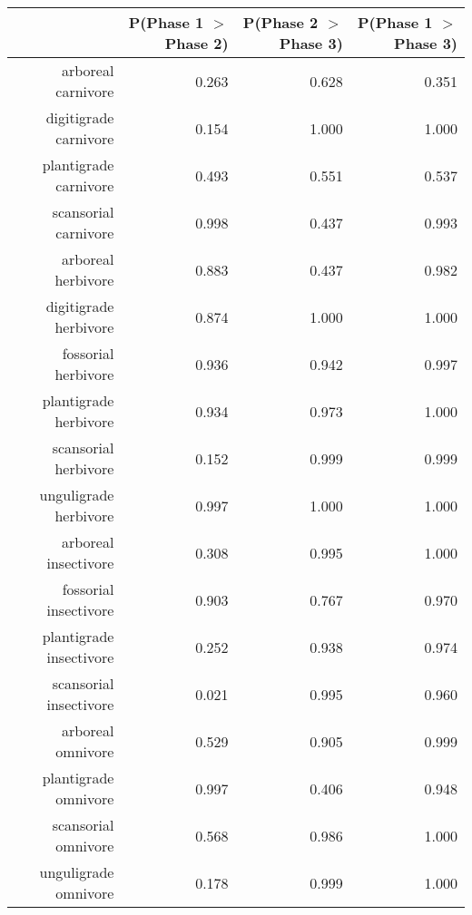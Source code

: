 \begin{table}[ht]
\centering
\begin{tabular}{rrrr}
  \hline
 & P(Phase 1 $>$ Phase 2) & P(Phase 2 $>$ Phase 3) & P(Phase 1 $>$ Phase 3) \\ 
  \hline
arboreal carnivore & 0.263 & 0.628 & 0.351 \\ 
  digitigrade carnivore & 0.154 & 1.000 & 1.000 \\ 
  plantigrade carnivore & 0.493 & 0.551 & 0.537 \\ 
  scansorial carnivore & 0.998 & 0.437 & 0.993 \\ 
  arboreal herbivore & 0.883 & 0.437 & 0.982 \\ 
  digitigrade herbivore & 0.874 & 1.000 & 1.000 \\ 
  fossorial herbivore & 0.936 & 0.942 & 0.997 \\ 
  plantigrade herbivore & 0.934 & 0.973 & 1.000 \\ 
  scansorial herbivore & 0.152 & 0.999 & 0.999 \\ 
  unguligrade herbivore & 0.997 & 1.000 & 1.000 \\ 
  arboreal insectivore & 0.308 & 0.995 & 1.000 \\ 
  fossorial insectivore & 0.903 & 0.767 & 0.970 \\ 
  plantigrade insectivore & 0.252 & 0.938 & 0.974 \\ 
  scansorial insectivore & 0.021 & 0.995 & 0.960 \\ 
  arboreal omnivore & 0.529 & 0.905 & 0.999 \\ 
  plantigrade omnivore & 0.997 & 0.406 & 0.948 \\ 
  scansorial omnivore & 0.568 & 0.986 & 1.000 \\ 
  unguligrade omnivore & 0.178 & 0.999 & 1.000 \\ 
   \hline
\end{tabular}
\label{tab:origin_plant}
\end{table}
